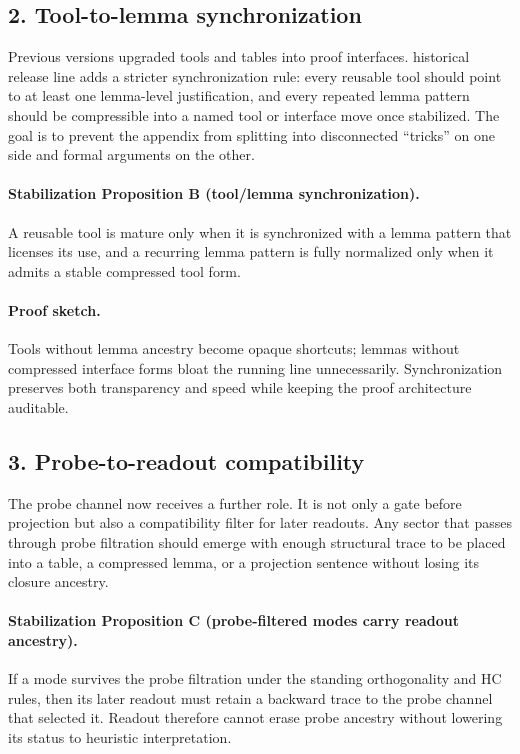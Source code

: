 \documentclass[12pt,a4paper]{article}
\DeclareRobustCommand{\QSCver}[1]{archival stage}
\renewcommand{\QSCver}[1]{historical release line}
\begin{document}
\subsection*{2. Tool-to-lemma synchronization}
Previous versions upgraded tools and tables into proof interfaces. \QSCver{v1.9.0}
adds a stricter synchronization rule: every reusable tool should point to at
least one lemma-level justification, and every repeated lemma pattern should be
compressible into a named tool or interface move once stabilized. The goal is to
prevent the appendix from splitting into disconnected ``tricks'' on one side and
formal arguments on the other.

\paragraph{Stabilization Proposition B (tool/lemma synchronization).}
A reusable tool is mature only when it is synchronized with a lemma pattern that
licenses its use, and a recurring lemma pattern is fully normalized only when it
admits a stable compressed tool form.

\paragraph{Proof sketch.}
Tools without lemma ancestry become opaque shortcuts; lemmas without compressed
interface forms bloat the running line unnecessarily. Synchronization preserves
both transparency and speed while keeping the proof architecture auditable.

\subsection*{3. Probe-to-readout compatibility}
The probe channel now receives a further role. It is not only a gate before
projection but also a compatibility filter for later readouts. Any sector that
passes through probe filtration should emerge with enough structural trace to be
placed into a table, a compressed lemma, or a projection sentence without losing
its closure ancestry.

\paragraph{Stabilization Proposition C (probe-filtered modes carry readout ancestry).}
If a mode survives the probe filtration under the standing orthogonality and HC
rules, then its later readout must retain a backward trace to the probe channel
that selected it. Readout therefore cannot erase probe ancestry without lowering
its status to heuristic interpretation.
\end{document}
